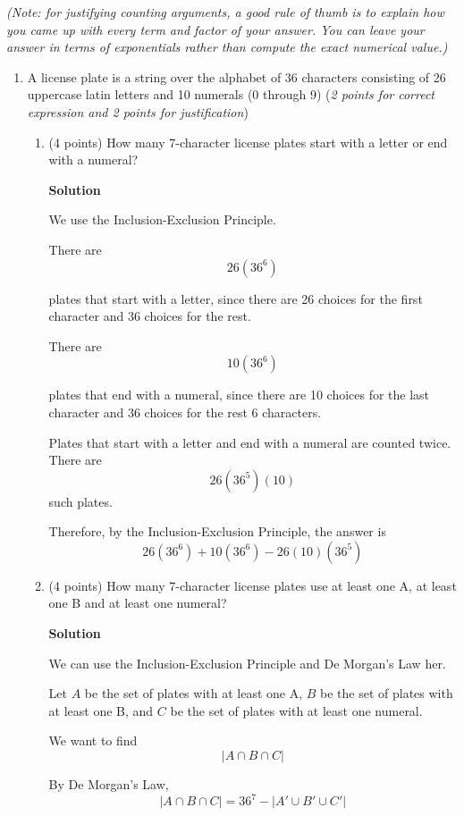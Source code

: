\documentclass[10pt,letterpaper,unboxed,cm]{article}
\begin{document}
\emph{(Note: for justifying counting arguments, a good rule of thumb is to explain how you came up with every term and factor of your answer. You can leave
your answer in terms of exponentials rather than compute the exact numerical value.)}
\begin{enumerate}





\item
A license plate is a string over the alphabet of 36 characters consisting of 26 uppercase latin letters and 10 numerals (0 through 9) (\emph{2 points for correct expression and 2 points for justification})

\begin{enumerate}

\item
(4 points)
How many 7-character license plates start with a letter or end with a numeral?

\textbf{Solution}

We use the Inclusion-Exclusion Principle.

There are
\[ 26(36^6) \]

plates that start with a letter, since there are 26 choices for the first character and 36 choices for the rest.

There are
\[ 10(36^6) \]

plates that end with a numeral, since there are 10 choices for the last
character and 36 choices for the rest 6 characters. 

Plates that start with a letter and end with a numeral are counted twice.
There are
\[ 26(36^5)(10) \]
such plates.

Therefore, by the Inclusion-Exclusion Principle, the answer is
\[ \boxed{26(36^6) + 10(36^6) - 26(10)(36^5)} \]

\item
(4 points)
How many 7-character license plates use at least one A, at least one B and at least one numeral?

\textbf{Solution}

We can use the Inclusion-Exclusion Principle and De Morgan's Law her.

Let $A$ be the set of plates with at least one A, $B$ be the set of plates with at least one B, and $C$ be the set of plates with at least one numeral.

We want to find
\[ |A \cap B \cap C| \]

By De Morgan's Law,
\[ |A \cap B \cap C| 
=
36^7 - |A' \cup B' \cup C'|\]


\end{enumerate}
\end{enumerate}
\end{document}
